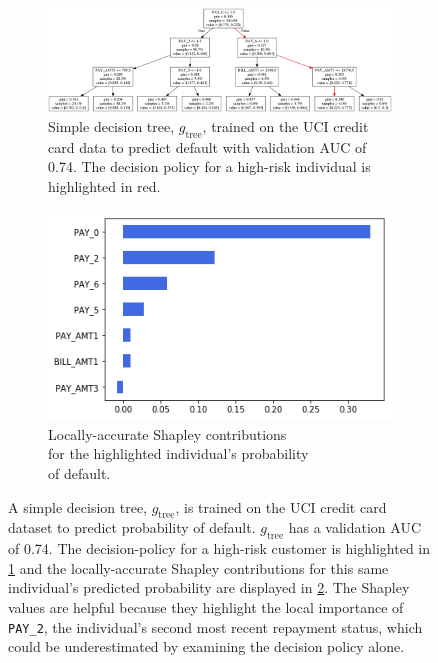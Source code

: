 \documentclass[fleqn]{article}
\begin{document}
\begin{figure}[ht!]
	\begin{subfigure}{.6\textwidth}
		\includegraphics[height=.45\linewidth, width=1.15\linewidth]{img/dt.png}
  		\caption{Simple decision tree, $g_{\text{tree}}$, trained on the UCI credit card data to predict default with validation AUC of 0.74. The decision policy for a high-risk individual is highlighted in red.}
  		\label{fig:dt}
	\end{subfigure}\hspace{50pt}
	\begin{subfigure}{.4\textwidth}
		\vspace{30pt}
  		\includegraphics[height=.5\linewidth, width=.8\linewidth]{img/shap.png}
  		\vspace{5pt}
  		\caption{Locally-accurate Shapley contributions\\ for the highlighted individual's probability\\ of default.}
  		\label{fig:shap}
	\end{subfigure}
	\caption{A simple decision tree, $g_{\text{tree}}$, is trained on the UCI credit card dataset to predict probability of default. $g_{\text{tree}}$ has a validation AUC of 0.74. The decision-policy for a high-risk customer is highlighted in \ref{fig:dt} and the locally-accurate Shapley contributions for this same individual's predicted probability are displayed in \ref{fig:shap}. The Shapley values are helpful because they highlight the local importance of \texttt{PAY\_2}, the individual's second most recent repayment status, which could be underestimated by examining the decision policy alone.}
	\label{fig:dt_shap}
\end{figure}
\end{document}
